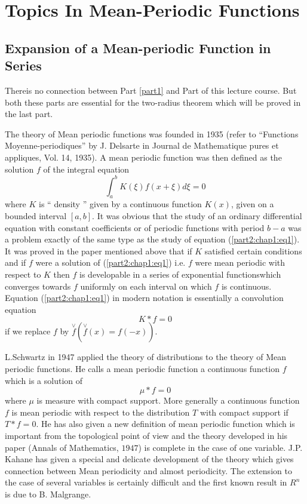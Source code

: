 
\part{Topics In Mean-Periodic Functions}\label{part2}%

\setcounter{chapter}{0}
\chapter{Expansion of a Mean-periodic Function in
  Series}\label{part2:chap1}%


There\pageoriginale is no connection between
Part \ref{part1} and Part 
\ref{part2} of this lecture course. But both these parts are essential for the
two-radius theorem which will be proved in the last part. 

The theory of Mean periodic functions was founded in 1935 (refer to
``Functions Moyenne-periodiques'' by J. Delsarte in Journal de
Mathematique pures et appliques, Vol. 14, 1935). A mean periodic
function was then defined as the solution $f$ of the integral equation 
\begin{equation*}
  \int^b_a K(\xi) f (x + \xi) d \xi = 0 \tag{1}\label{part2:chap1:eq1}
\end{equation*}
where $K$ is `` density '' given by a continuous function $K(x)$,
given on a bounded interval $[a, b]$. It was obvious that the study of
an ordinary differential equation with constant coefficients or of
periodic functions with period $b - a$ was a problem exactly of the
same type as the study of equation (\ref{part2:chap1:eq1}). It was proved in the paper
mentioned above that if $K$ satisfied certain conditions and if $f$
were a solution of (\ref{part2:chap1:eq1}) i.e. $f$ were mean periodic
with respect to 
$K$ then $f$ is developable in a series of exponential
functions\pageoriginale which 
converges towards $f$ uniformly on each interval on which $f$ is
continuous. Equation (\ref{part2:chap1:eq1}) in modern notation is
essentially a convolution equation 
$$
K \ast f = 0
$$
if we replace $f$ by $ \overset{\vee}{f} (\overset{\vee}{f} (x) = f (-x))$.

L.Schwartz in 1947 applied the theory of distributions to the
theory of Mean periodic functions. He calls a mean periodic function
a continuous function $f$ which is a solution of  
$$
\mu \ast f = 0
$$
where $\mu$ is measure with compact support. More generally a
continuous function $f$ is mean periodic with respect to the
distribution $T$ with compact support if $T \ast f = 0$. He has also
given a new definition of mean periodic function which is important
from the topological point of view and the theory developed in his
paper (Annals of Mathematics, $1947$) is complete in the case of one
variable. J.P. Kahane has given a special and delicate development of
the theory which gives connection between Mean periodicity and almost
periodicity. The extension to the case of several variables is
certainly difficult and the first known result in $R^n$ is due to
B. Malgrange. 

